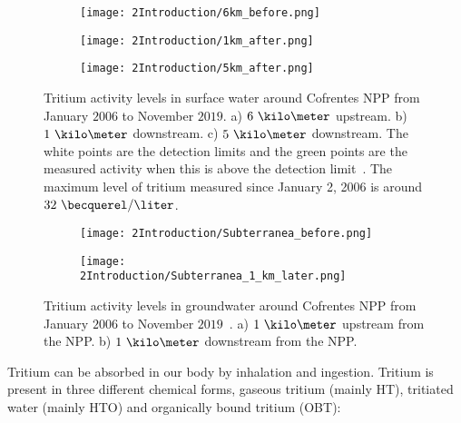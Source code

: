 \begin{figure}
\centering
    \begin{subfigure}[b]{0.7\textwidth}
    \centering
    \texttt{[image: 2Introduction/6km\_before.png]}  
    \caption{\label{subfig:TritiumL6kB}}
    \end{subfigure}
    \hfill
    \begin{subfigure}[b]{0.7\textwidth}
    \centering
    \texttt{[image: 2Introduction/1km\_after.png]}  
    \caption{\label{subfig:TritiumL1kA}}
    \end{subfigure}
    \hfill
    \begin{subfigure}[b]{0.7\textwidth}
    \centering
    \texttt{[image: 2Introduction/5km\_after.png]}  
    \caption{\label{subfig:TritiumL5kA}}
    \end{subfigure}
 \caption{Tritium activity levels in surface water around Cofrentes NPP from January $2006$ to November $2019$. a) $6~\kilo\meter$ upstream. b) $1~\kilo\meter$ downstream. c) $5~\kilo\meter$ downstream. The white points are the detection limits and the green points are the measured activity when this is above the detection limit~\cite{REM}. The maximum level of tritium measured since January 2, 2006 is around $32~\becquerel/\liter$.}
 \label{subfig:MeasurementsCofrentesSurface}
\end{figure}

\begin{figure}
\centering
    \begin{subfigure}[b]{0.9\textwidth}
    \centering
    \texttt{[image: 2Introduction/Subterranea\_before.png]}  
    \caption{\label{subfig:TritiumLG1kB}}
    \end{subfigure}
    \hfill
    \begin{subfigure}[b]{0.9\textwidth}
    \centering
    \texttt{[image: 2Introduction/Subterranea\_1\_km\_later.png]}  
    \caption{\label{subfig:TritiumLG1kA}}
    \end{subfigure}
 \caption{Tritium activity levels in groundwater around Cofrentes NPP from January $2006$ to November $2019$~\cite{REM}. a) $1~\kilo\meter$ upstream from the NPP. b) $1~\kilo\meter$ downstream from the NPP.}
 \label{fig:MeasurementsCofrentesGroundWater}
\end{figure}

Tritium can be absorbed in our body by inhalation and ingestion. Tritium is present in three different chemical forms, gaseous tritium (mainly HT), tritiated water (mainly HTO) and organically bound tritium (OBT):

